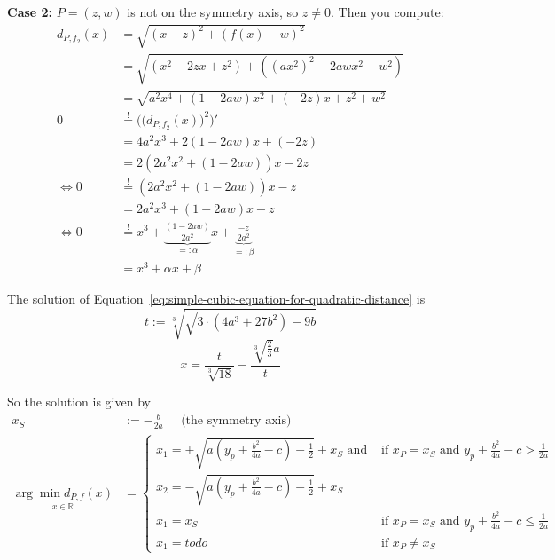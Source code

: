 \documentclass[a4paper]{scrartcl}
\theoremstyle{break}
\def\mdr{\ensuremath{\mathbb{R}}}
\theoremstyle{nonumberplain}
\def\mdr{\ensuremath{\mathbb{R}}}
\begin{document}
\textbf{Case 2:} $P = (z, w)$ is not on the symmetry axis, so $z \neq 0$. Then you compute:
\begin{align}
  d_{P,{f_2}}(x)  &= \sqrt{(x-z)^2 + (f(x)-w)^2}\\
    &= \sqrt{(x^2 - 2zx + z^2) + ((ax^2)^2 - 2 awx^2 + w^2)}\\
    &= \sqrt{a^2x^4 + (1- 2 aw)x^2 +(- 2z)x + z^2 + w^2}\\
  0 &\stackrel{!}{=} \Big(\big(d_{P, {f_2}}(x)\big)^2\Big)' \\
    &= 4a^2x^3 + 2(1- 2 aw)x +(- 2z)\\
    &= 2 \left (2a^2x^2 + (1- 2 aw) \right )x - 2z\\
    \Leftrightarrow 0 &\stackrel{!}{=} (2a^2x^2  + (1- 2 aw)) x - z\\
    &= 2 a^2 x^3 + (1- 2 aw) x - z\\
\Leftrightarrow 0 &\stackrel{!}{=} x^3 + \underbrace{\frac{(1- 2 aw)}{2 a^2}}_{=: \alpha} x  + \underbrace{\frac{-z}{2 a^2}}_{=: \beta}\\
    &= x^3 + \alpha x + \beta\label{eq:simple-cubic-equation-for-quadratic-distance}
\end{align}

The solution of Equation~\ref{eq:simple-cubic-equation-for-quadratic-distance}
is
\[t := \sqrt[3]{\sqrt{3 \cdot (4a^3 + 27 b^2)} -9b}\]
\[x = \frac{t}{\sqrt[3]{18}} - \frac{\sqrt[3]{\frac{2}{3}} a }{t}\]



\goodbreak
So the solution is given by
\begin{align*}
x_S &:= - \frac{b}{2a} \;\;\;\;\; \text{(the symmetry axis)}\\
\underset{x\in\mdr}{\arg \min d_{P,f}(x)} &= \begin{cases}
     x_1 = +\sqrt{a (y_p + \frac{b^2}{4a} - c) - \frac{1}{2}} + x_S \text{ and }   &\text{if } x_P = x_S \text{ and } y_p + \frac{b^2}{4a} - c >  \frac{1}{2a} \\
     x_2 = -\sqrt{a (y_p + \frac{b^2}{4a} - c) - \frac{1}{2}} + x_S\\
     x_1 = x_S   &\text{if } x_P = x_S \text{ and } y_p + \frac{b^2}{4a} - c \leq  \frac{1}{2a} \\
     x_1 = todo   &\text{if } x_P \neq x_S
    \end{cases}
\end{align*}

\clearpage
\end{document}

